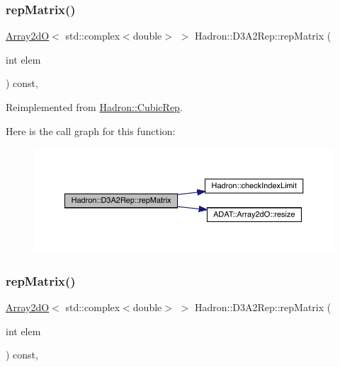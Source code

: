 \subsubsection{\texorpdfstring{repMatrix()}{repMatrix()}\hspace{0.1cm}{\footnotesize\ttfamily [1/2]}}
{\footnotesize\ttfamily \mbox{\hyperlink{classADAT_1_1Array2dO}{Array2dO}}$<$ std\+::complex$<$double$>$ $>$ Hadron\+::\+D3\+A2\+Rep\+::rep\+Matrix (\begin{DoxyParamCaption}\item[{int}]{elem }\end{DoxyParamCaption}) const\hspace{0.3cm}{\ttfamily [inline]}, {\ttfamily [virtual]}}



Reimplemented from \mbox{\hyperlink{structHadron_1_1CubicRep_ac5d7e9e6f4ab1158b5fce3e4ad9e8005}{Hadron\+::\+Cubic\+Rep}}.

Here is the call graph for this function\+:
\nopagebreak
\begin{figure}[H]
\begin{center}
\leavevmode
\includegraphics[width=350pt]{d5/d7f/structHadron_1_1D3A2Rep_a0e868a4c14c9126108a49d429add3c94_cgraph}
\end{center}
\end{figure}
\mbox{\label{structHadron_1_1D3A2Rep_a0e868a4c14c9126108a49d429add3c94}} 
\subsubsection{\texorpdfstring{repMatrix()}{repMatrix()}\hspace{0.1cm}{\footnotesize\ttfamily [2/2]}}
{\footnotesize\ttfamily \mbox{\hyperlink{classADAT_1_1Array2dO}{Array2dO}}$<$ std\+::complex$<$double$>$ $>$ Hadron\+::\+D3\+A2\+Rep\+::rep\+Matrix (\begin{DoxyParamCaption}\item[{int}]{elem }\end{DoxyParamCaption}) const\hspace{0.3cm}{\ttfamily [inline]}, {\ttfamily [virtual]}}



